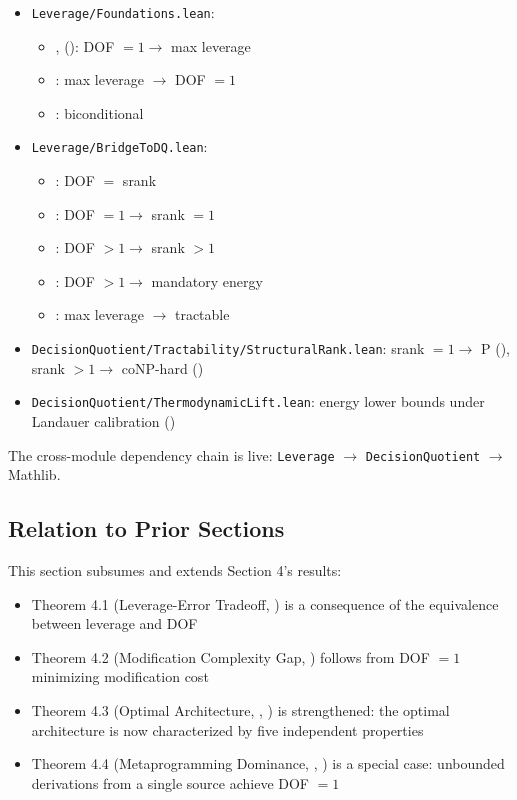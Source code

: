 \begin{itemize}
\item \nolinkurl{Leverage/Foundations.lean}:
  \begin{itemize}
  \item {},  (): DOF $= 1 \to$ max leverage
  \item {}: max leverage $\to$ DOF $= 1$
  \item {}: biconditional
  \end{itemize}
\item \nolinkurl{Leverage/BridgeToDQ.lean}:
  \begin{itemize}
  \item {}: DOF $=$ srank
  \item {}: DOF $= 1 \to$ srank $= 1$
  \item {}: DOF $> 1 \to$ srank $> 1$
  \item {}: DOF $> 1 \to$ mandatory energy
  \item {}: max leverage $\to$ tractable
  \end{itemize}
\item \nolinkurl{DecisionQuotient/Tractability/StructuralRank.lean}: srank $= 1 \to$ P (), srank $> 1 \to$ coNP-hard ()
\item \nolinkurl{DecisionQuotient/ThermodynamicLift.lean}: energy lower bounds under Landauer calibration ()
\end{itemize}

The cross-module dependency chain is live: \texttt{Leverage} $\to$ \texttt{DecisionQuotient} $\to$ Mathlib.

\subsection{Relation to Prior Sections}

This section subsumes and extends Section 4's results:
\begin{itemize}
\item Theorem 4.1 (Leverage-Error Tradeoff, ) is a consequence of the equivalence between leverage and DOF
\item Theorem 4.2 (Modification Complexity Gap, ) follows from DOF $= 1$ minimizing modification cost
\item Theorem 4.3 (Optimal Architecture, , ) is strengthened: the optimal architecture is now characterized by five independent properties
\item Theorem 4.4 (Metaprogramming Dominance, , ) is a special case: unbounded derivations from a single source achieve DOF $= 1$
\end{itemize}

